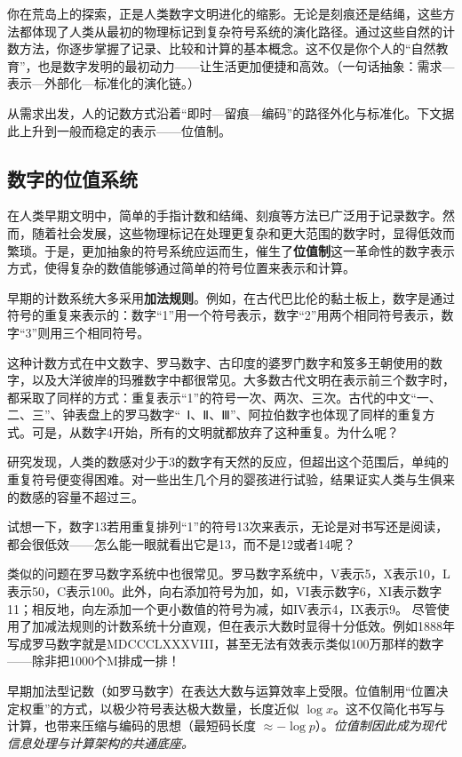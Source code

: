 你在荒岛上的探索，正是人类数字文明进化的缩影。无论是刻痕还是结绳，这些方法都体现了人类从最初的物理标记到复杂符号系统的演化路径。通过这些自然的计数方法，你逐步掌握了记录、比较和计算的基本概念。这不仅是你个人的“自然教育”，也是数字发明的最初动力——让生活更加便捷和高效。{（一句话抽象：需求—表示—外部化—标准化的演化链。）}

从需求出发，人的记数方式沿着“即时—留痕—编码”的路径外化与标准化。下文据此上升到一般而稳定的表示——位值制。

\subsection{数字的位值系统}
在人类早期文明中，简单的手指计数和结绳、刻痕等方法已广泛用于记录数字。然而，随着社会发展，这些物理标记在处理更复杂和更大范围的数字时，显得低效而繁琐。于是，更加抽象的符号系统应运而生，催生了{\bf 位值制}这一革命性的数字表示方式，使得复杂的数值能够通过简单的符号位置来表示和计算。

早期的计数系统大多采用{\bf 加法规则}。例如，在古代巴比伦的黏土板上，数字是通过符号的重复来表示的：数字“1”用一个符号表示，数字“2”用两个相同符号表示，数字“3”则用三个相同符号。

这种计数方式在中文数字、罗马数字、古印度的婆罗门数字和笈多王朝使用的数字，以及大洋彼岸的玛雅数字中都很常见。大多数古代文明在表示前三个数字时，都采取了同样的方式：重复表示“1”的符号一次、两次、三次。古代的中文“一、二、三”、钟表盘上的罗马数字“~Ⅰ、Ⅱ、Ⅲ”、阿拉伯数字也体现了同样的重复方式。可是，从数字4开始，所有的文明就都放弃了这种重复。为什么呢？

研究发现，人类的数感对少于3的数字有天然的反应，但超出这个范围后，单纯的重复符号便变得困难。对一些出生几个月的婴孩进行试验，结果证实人类与生俱来的数感的容量不超过三。

试想一下，数字13若用重复排列“1”的符号13次来表示，无论是对书写还是阅读，都会很低效——怎么能一眼就看出它是13，而不是12或者14呢？

类似的问题在罗马数字系统中也很常见。罗马数字系统中，V表示5，X表示10，L表示50，C表示100。此外，向右添加符号为加，如，VI表示数字6，XI表示数字11；相反地，向左添加一个更小数值的符号为减，如IV表示4，IX表示9。
尽管使用了加减法规则的计数系统十分直观，但在表示大数时显得十分低效。例如1888年写成罗马数字就是MDCCCLXXXVIII，甚至无法有效表示类似100万那样的数字——除非把1000个M排成一排！

早期加法型记数（如罗马数字）在表达大数与运算效率上受限。位值制用“位置决定权重”的方式，以极少符号表达极大数量，长度近似 $\log x$。这不仅简化书写与计算，也带来压缩与编码的思想（最短码长度 $\approx-\log p$）。\emph{位值制因此成为现代信息处理与计算架构的共通底座。}

